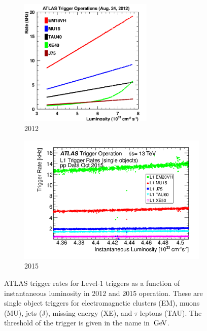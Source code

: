 \begin{figure}[h!]
  \centering
  \captionsetup{justification=centering}

   \begin{subfigure}[t]{0.5\textwidth}
        \centering
        \includegraphics[width=0.7\textwidth]{figures/2012_trigger_rates}
        \caption{2012}
    \end{subfigure}%
    \begin{subfigure}[t]{0.5\textwidth}
        \centering
        \includegraphics[width=\textwidth]{figures/2015_trigger_rate}
        \caption{2015}
    \end{subfigure}

   \caption{ATLAS trigger rates for Level-$1$ triggers as a function of instantaneous luminosity in 2012 and 2015 operation. These are single object triggers for electromagnetic clusters (EM), muons (MU), jets (J), missing energy (XE), and $\tau$ leptons (TAU). The threshold of the trigger is given in the name in $\GeV$.~\cite{TriggerOps}}
  \label{fig:trigger_rates}
\end{figure}


